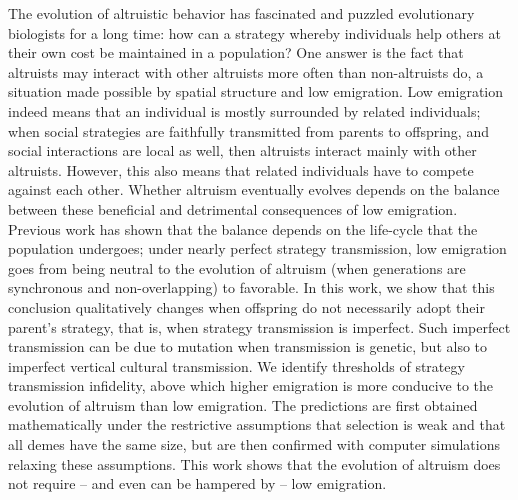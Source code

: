 \documentclass[11pt, letterpaper]{article}
\begin{document}
The evolution of altruistic behavior has fascinated and puzzled evolutionary biologists for a long time: how can a strategy whereby individuals help others at their own cost be maintained in a population? One answer is the fact that altruists may interact with other altruists more often than non-altruists do, a situation made possible by spatial structure and low emigration. Low emigration indeed means that an individual is mostly surrounded by related individuals; when social strategies are faithfully transmitted from parents to offspring, and social interactions are local as well, then altruists interact mainly with other altruists. However, this also means that related individuals have to compete against each other. Whether altruism eventually evolves depends on the balance between these beneficial and detrimental consequences of low emigration. Previous work has shown that the balance depends on the life-cycle that the population undergoes; under nearly perfect strategy transmission, low emigration goes from being neutral to the evolution of altruism (when generations are synchronous and non-overlapping) to favorable. In this work, we show that this conclusion qualitatively changes when offspring do not necessarily adopt their parent's strategy, that is, when strategy transmission is imperfect. Such imperfect transmission can be due to mutation when transmission is genetic, but also to imperfect vertical cultural transmission. We identify thresholds of strategy transmission infidelity, above which higher emigration is more conducive to the evolution of altruism than low emigration. The predictions are first obtained mathematically under the restrictive assumptions that selection is weak and that all demes have the same size, but are then confirmed with computer simulations relaxing these assumptions. This work shows that the evolution of altruism does not require -- and even can be hampered by -- low emigration. 





\clearpage

\end{document}
